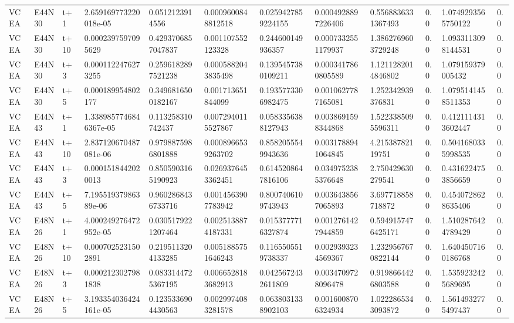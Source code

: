 \begin{landscape}
\begin{longtable}{llllllllllll}
VCEA & E44N30 & t+1 & 2.659169773220018e-05 & 0.0512123914556 & 0.0009600848812518 & 0.0259427859224155 & 0.0004928897226406 & 0.5568836331367493 & 0.0 & 1.0749293565750122 & 0.0 \\
VCEA & E44N30 & t+10 & 0.0002397597095629 & 0.4293706857047837 & 0.001107552123328 & 0.244600149936357 & 0.0007332551179937 & 1.3862769603729248 & 0.0 & 1.0933113098144531 & 0.0 \\
VCEA & E44N30 & t+3 & 0.0001122476273255 & 0.2596182897521238 & 0.0005882043835498 & 0.1395457380109211 & 0.0003417860805589 & 1.1211282014846802 & 0.0 & 1.079159379005432 & 0.0 \\
VCEA & E44N30 & t+5 & 0.000189954802177 & 0.3496816500182167 & 0.001713651844099 & 0.1935773306982475 & 0.0010627787165081 & 1.252342939376831 & 0.0 & 1.0795141458511353 & 0.0 \\
VCEA & E44N43 & t+1 & 1.3389857746846367e-05 & 0.113258310742437 & 0.0072940115527867 & 0.0583356388127943 & 0.0038691598344868 & 1.5223385095596311 & 0.0 & 0.4121114313602447 & 0.0 \\
VCEA & E44N43 & t+10 & 2.837120670487081e-06 & 0.9798875986801888 & 0.0008966539263702 & 0.8582055549943636 & 0.0031788941064845 & 4.21538782119751 & 0.0 & 0.5041680335998535 & 0.0 \\
VCEA & E44N43 & t+3 & 0.0001518442020013 & 0.8505903165190923 & 0.0269376453362451 & 0.6145208647816106 & 0.0349752385376648 & 2.750429630279541 & 0.0 & 0.4316224753856659 & 0.0 \\
VCEA & E44N43 & t+5 & 7.19551937986389e-06 & 0.9602868436733716 & 0.0014563907783942 & 0.8007406109743943 & 0.0036438567065893 & 3.697718858718872 & 0.0 & 0.4540728628635406 & 0.0 \\
VCEA & E48N26 & t+1 & 4.000249276472952e-05 & 0.0305179221207464 & 0.0025138874187331 & 0.0153777716327874 & 0.0012761427944859 & 0.5949157476425171 & 0.0 & 1.5102876424789429 & 0.0 \\
VCEA & E48N26 & t+10 & 0.0007025231502891 & 0.2195113204133285 & 0.0051885751646243 & 0.1165505519738337 & 0.0029393234569367 & 1.2329567670822144 & 0.0 & 1.6404507160186768 & 0.0 \\
VCEA & E48N26 & t+3 & 0.0002123027981838 & 0.0833144725367195 & 0.0066528183682913 & 0.0425672432611809 & 0.0034709728096478 & 0.9198664426803588 & 0.0 & 1.5359232425689695 & 0.0 \\
VCEA & E48N26 & t+5 & 3.193354036424161e-05 & 0.1235336904430563 & 0.0029974083281578 & 0.0638031338902103 & 0.0016008706324934 & 1.0222865343093872 & 0.0 & 1.5614932775497437 & 0.0 \\

\end{longtable}
\end{landscape}
